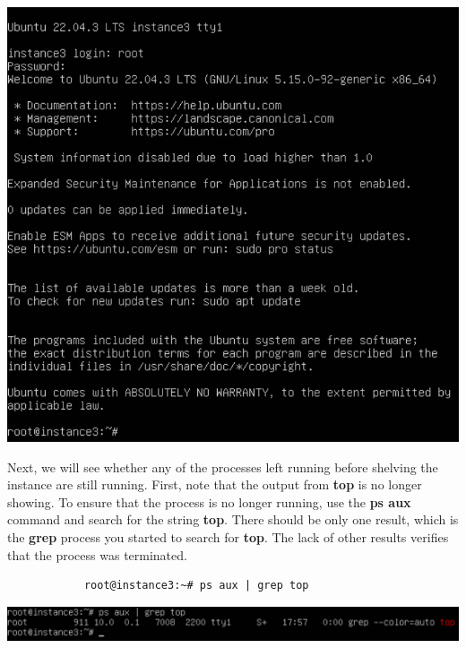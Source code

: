 \documentclass[letterpaper, 12pt]{article}
\begin{document}
\begin{enumerate}
\begin{labstep}
        \begin{center}
            \includegraphics[width=\linewidth]{images/part5/step15.png}
        \end{center}
    \end{labstep}

    \begin{labstep}
        Next, we will see whether any of the processes left running before shelving the instance are still running.
        First, note that the output from \textbf{top} is no longer showing.
        To ensure that the process is no longer running, use the \textbf{ps aux} command and search for the string \textbf{top}.
        There should be only one result, which is the \textbf{grep} process you started to search for \textbf{top}.
        The lack of other results verifies that the process was terminated.
        \begin{lstlisting}
            root@instance3:~# ps aux | grep top
        \end{lstlisting}

        \begin{center}
            \includegraphics[width=\linewidth]{images/part5/step16.png}
        \end{center}
    \end{labstep}


\end{enumerate}
\end{document}
